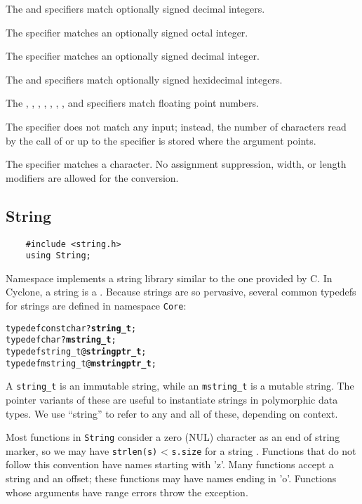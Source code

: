 The  and  specifiers match optionally signed decimal
integers.

The  specifier matches an optionally signed octal integer.

The  specifier matches an optionally signed decimal integer.

The  and  specifiers match optionally signed hexidecimal
integers.

The , , , , , ,
, and  specifiers match floating point numbers.

The  specifier does not match any input; instead, the number of
characters read by the call of  or  up to the
 specifier is stored where the argument points.

The \code{\%} specifier matches a \code{\%} character.  No assignment
suppression, width, or length modifiers are allowed for the \code{\%}
conversion.

\subsection{String}

\begin{verbatim}
    #include <string.h>
    using String;
\end{verbatim}

Namespace  implements a string library similar to the one
provided by C\@.  In Cyclone, a string is a .  Because
strings are so pervasive, several common typedefs for strings are
defined in namespace \texttt{Core}:
\begin{alltt}
    typedef const char ?\textbf{string_t};
    typedef char ?\textbf{mstring_t};
    typedef string_t @\textbf{stringptr_t};
    typedef mstring_t @\textbf{mstringptr_t};
\end{alltt}
A \texttt{string_t} is an immutable string, while an
\texttt{mstring_t} is a mutable string.  The pointer variants of these
are useful to instantiate strings in polymorphic data types.  We use
``string'' to refer to any and all of these, depending on context.

Most functions in \texttt{String} consider a zero (NUL) character as
an end of string marker, so we may have \texttt{strlen(s)} <
\texttt{s.size} for a string .  Functions that do not follow
this convention have names starting with 'z'.  Many functions accept a
string and an offset; these functions may have names ending in 'o'.
Functions whose arguments have range errors throw the
 exception.

